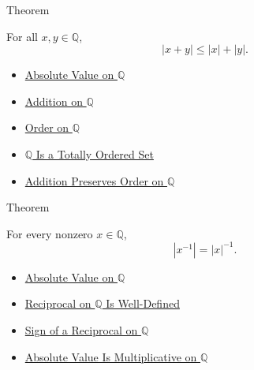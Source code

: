 \begin{theorembox}{Theorem}
\begin{theorem}
\label{thm:triangle-inequality-on-q}
For all $x,y\in\mathbb{Q}$,
\[
|x+y|\le |x|+|y|.
\]
\end{theorem}
\end{theorembox}

\begin{dependencies}
\begin{itemize}
  \item \hyperref[def:absolute-value-on-q]{Absolute Value on $\mathbb{Q}$}
  \item \hyperref[def:addition-on-q-classes]{Addition on $\mathbb{Q}$}
  \item \hyperref[def:order-on-q]{Order on $\mathbb{Q}$}
  \item \hyperref[thm:q-totally-ordered-set]{$\mathbb{Q}$ Is a Totally Ordered Set}
  \item \hyperref[thm:addition-preserves-order-on-q]{Addition Preserves Order on $\mathbb{Q}$}
\end{itemize}
\end{dependencies}

\begin{theorembox}{Theorem}
\begin{theorem}
\label{thm:absolute-value-of-reciprocal-q}
For every nonzero $x\in\mathbb{Q}$,
\[
|x^{-1}|=|x|^{-1}.
\]
\end{theorem}
\end{theorembox}

\begin{dependencies}
\begin{itemize}
  \item \hyperref[def:absolute-value-on-q]{Absolute Value on $\mathbb{Q}$}
  \item \hyperref[thm:reciprocal-on-q-well-defined]{Reciprocal on $\mathbb{Q}$ Is Well-Defined}
  \item \hyperref[thm:sign-of-reciprocal-q]{Sign of a Reciprocal on $\mathbb{Q}$}
  \item \hyperref[thm:absolute-value-multiplicative-on-q]{Absolute Value Is Multiplicative on $\mathbb{Q}$}
\end{itemize}
\end{dependencies}
